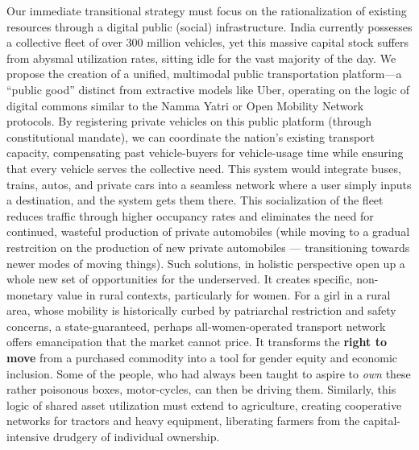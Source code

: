 Our immediate transitional strategy must focus on the rationalization of
existing resources through a digital public (social) infrastructure.
India currently possesses a collective fleet of over 300 million
vehicles, yet this massive capital stock suffers from abysmal
utilization rates, sitting idle for the vast majority of the day. We
propose the creation of a unified, multimodal public transportation
platform---a ``public good'' distinct from extractive models like Uber,
operating on the logic of digital commons similar to the Namma Yatri or
Open Mobility Network protocols. By registering private vehicles on this
public platform (through constitutional mandate), we can coordinate the
nation's existing transport capacity, compensating past vehicle-buyers
for vehicle-usage time while ensuring that every vehicle serves the
collective need. This system would integrate buses, trains, autos, and
private cars into a seamless network where a user simply inputs a
destination, and the system gets them there. This socialization of the
fleet reduces traffic through higher occupancy rates and eliminates the
need for continued, wasteful production of private automobiles (while
moving to a gradual restrcition on the production of new private
automobiles --- transitioning towards newer modes of moving things).
Such solutions, in holistic perspective open up a whole new set of
opportunities for the underserved. It creates specific, non-monetary
value in rural contexts, particularly for women. For a girl in a rural
area, whose mobility is historically curbed by patriarchal restriction
and safety concerns, a state-guaranteed, perhaps all-women-operated
transport network offers emancipation that the market cannot price. It
transforms the \textbf{right to move} from a purchased commodity into a
tool for gender equity and economic inclusion. Some of the people, who
had always been taught to aspire to \emph{own} these rather poisonous
boxes, motor-cycles, can then be driving them. Similarly, this logic of
shared asset utilization must extend to agriculture, creating
cooperative networks for tractors and heavy equipment, liberating
farmers from the capital-intensive drudgery of individual ownership.

